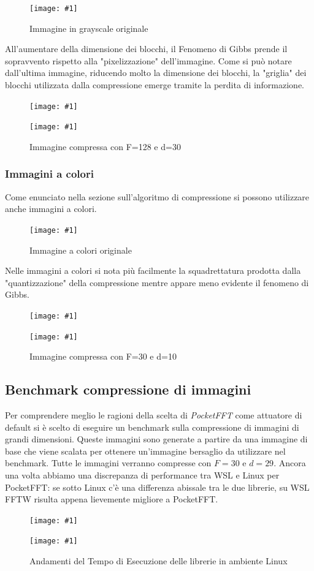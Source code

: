 \documentclass[a4paper,11pt,oneside, table]{article}
\newcommand{\putimage}[4] {
	\begin{figure}[H]
	    \centering
	    \texttt{[image: \#1]}
	    \caption{#2}\label{#3}
	\end{figure}
}
\newcommand{\putsubimage}[5] {
  \begin{minipage}{{#4}\linewidth}
	    \centering
      \texttt{[image: \#1]}
	    \caption{#2}\label{#3}
	\end{minipage}
}
\newcommand{\putimagecouple}[2] {
  \begin{figure}[!htb]
      \centering
      #1
      \hspace{0.5cm}
      #2
  \end{figure}
}
\begin{document}
\putimage{./images/compression-gb-original.png}{Immagine in grayscale originale}{png:compression-cl-original}{0.45}

All'aumentare della dimensione dei blocchi, il Fenomeno di Gibbs prende il sopravvento rispetto alla "pixelizzazione" dell'immagine.
Come si pu\`o notare dall'ultima immagine, riducendo molto la dimensione dei blocchi, la "griglia" dei blocchi utilizzata dalla compressione emerge tramite la perdita di informazione.

\putimagecouple
  {\putsubimage{./images/compression-gb-F8-d2.png}{Immagine compressa con F=8 e d=2}{png:compression-gb-F8-d2}{0.45}{0.99}}
  {\putsubimage{./images/compression-gb-F128-d30.png}{Immagine compressa con F=128 e d=30}{png:compression-gb-F128-d30}{0.45}{0.99}}

\newpage

\subsubsection{Immagini a colori}

Come enunciato nella sezione sull'algoritmo di compressione si possono utilizzare anche immagini a colori.

\putimage{./images/compression-cl-original.png}{Immagine a colori originale}{png:compression-cl-original}{0.45}

Nelle immagini a colori si nota pi\`u facilmente la squadrettatura prodotta dalla "quantizzazione" della compressione mentre appare meno evidente il fenomeno di Gibbs.

\putimagecouple
  {\putsubimage{./images/compression-cl-F30-d50.png}{Immagine compressa con F=30 e d=50}{png:compression-cl-F30-d50}{0.45}{0.99}}
  {\putsubimage{./images/compression-cl-F30-d10.png}{Immagine compressa con F=30 e d=10}{png:compression-cl-F30-d10}{0.45}{0.99}}

\newpage

\subsection{Benchmark compressione di immagini}

Per comprendere meglio le ragioni della scelta di \textit{PocketFFT} come attuatore di default si \`e scelto di eseguire un benchmark sulla compressione di immagini di grandi dimensioni.
Queste immagini sono generate a partire da una immagine di base che viene scalata per ottenere un'immagine bersaglio da utilizzare nel benchmark.
Tutte le immagini verranno compresse con $F=30$ e $d=29$.
Ancora una volta abbiamo una discrepanza di performance tra WSL e Linux per PocketFFT: se sotto Linux c'\`e una differenza abissale tra le due librerie, su WSL FFTW risulta appena lievemente migliore a PocketFFT.

\putimagecouple
  {\putsubimage{./images/benchmark-compression-wsl.png}{Andamenti del Tempo di Esecuzione delle librerie in ambiente WSL}{png:benchmark-compression-wsl}{0.45}{0.99}}
  {\putsubimage{./images/benchmark-compression-linux.png}{Andamenti del Tempo di Esecuzione delle librerie in ambiente Linux}{png:benchmark-compression-linux}{0.45}{0.99}}

\printbibliography[title={Bibliografia}]
\end{document}
